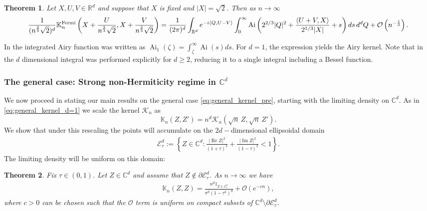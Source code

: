 \documentclass[%
 jmp,
cp,  %
 amsmath,amsthm,amssymb,%
 reprint,%
onecolumn]{revtex4-2}
\newtheorem{theorem}{Theorem}[section]
\begin{document}
\begin{theorem} \label{thm:fermionsEdgeDensity_intro}
    Let $X, U, V\in\mathbb R^d$ and suppose that $X$ is fixed and $\lvert X\rvert = \sqrt 2$. 
    Then as $n\to\infty$ 
    \begin{align} \label{eq:fermionsAiryd_intro}
    \frac{1}{(n^\frac{2}{3} \sqrt 2)^d} \mathbb K_n^{\rm Fermi}\left(X+\frac{U}{n^\frac{2}{3} \sqrt 2}, X + \frac{V}{n^\frac{2}{3} \sqrt 2}\right) 
    =  \frac{1}{(2\pi)^d}\int_{\mathbb R^d} e^{-i \langle Q,U-V\rangle} \int_0^\infty\operatorname{Ai}\left(2^{2/3} \lvert Q\rvert^2 + \frac{\langle U+V,X\rangle}{2^{1/3}\lvert X\rvert}+s\right) ds\,d^d Q
    +\mathcal O\left(n^{-\frac{1}{3}}\right).
    \end{align}
    \end{theorem}     
In \cite{DeDoMaSc} the integrated Airy function was written as $\operatorname{Ai}_1(\zeta) = \int_\zeta^\infty \operatorname{Ai}(s) ds$.    
    For $d=1$, the expression yields the Airy kernel\cite{DeDoMaSc}. 
    Note that in \cite{BDMS} the $d$ dimensional integral was performed explicitly for $d\geq 2$, reducing it to a single integral including a Bessel function. 


    \subsubsection{The general case: Strong non-Hermiticity regime in $\mathbb{C}^d$}

    We now proceed in stating our main results on the general case \eqref{eq:general_kernel_pre}, starting with the limiting density on $\mathbb C^d$. As in \eqref{eq:general_kernel_d=1} we scale the kernel $\mathcal K_n$ as 
    \begin{equation} \label{eq:gener_kernel_d}
        \mathbb K_n(Z,Z')= n^d \mathcal K_n\left(\sqrt n\, Z, \sqrt n\, Z' \right).
\end{equation}
    We show that under this rescaling the points will accumulate on the  $2d-$dimensional ellipsoidal domain
    \begin{align*}
    \mathcal E_\tau^d := \left\{Z\in \mathbb C^d : \frac{\lvert \operatorname{Re} Z\rvert^2}{(1+\tau)^2}
    + \frac{\lvert \operatorname{Im} Z\rvert^2}{(1-\tau)^2} < 1\right\}. 
    \end{align*}
    The limiting density will be uniform on this domain:
    \begin{theorem} \label{thm:limitingDensity}
        Fix $\tau\in (0,1)$. Let $Z\in \mathbb C^d$ and assume that $Z\not\in \partial \mathcal E_\tau^d$. As $n\to\infty$ we have
        \begin{align}
        \mathbb K_n(Z,Z) = \frac{n^d \mathfrak{1}_{Z\in \mathcal E_\tau^d}}{\pi^d (1-\tau^2)^d} + \mathcal O\left(e^{-cn}\right),
        \end{align}
        where $c>0$ can be chosen such that the $\mathcal O$ term is uniform on compact subsets of $\mathbb C^d \setminus \partial \mathcal E_\tau^d$.
        \end{theorem}
        
\end{document}
